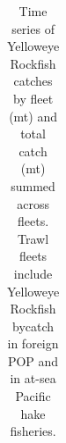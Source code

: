 \documentclass[
]{scrartcl}
\begin{document}
\endgroup

\newpage{}

\begin{landscape}
\begingroup
\fontsize{9.0pt}{10.8pt}\selectfont

\begin{longtable}{>{\raggedleft\arraybackslash}p{\dimexpr 56.25pt -2\tabcolsep-1.5\arrayrulewidth}>{\raggedleft\arraybackslash}p{\dimexpr 56.25pt -2\tabcolsep-1.5\arrayrulewidth}>{\raggedleft\arraybackslash}p{\dimexpr 56.25pt -2\tabcolsep-1.5\arrayrulewidth}>{\raggedleft\arraybackslash}p{\dimexpr 56.25pt -2\tabcolsep-1.5\arrayrulewidth}>{\raggedleft\arraybackslash}p{\dimexpr 56.25pt -2\tabcolsep-1.5\arrayrulewidth}>{\raggedleft\arraybackslash}p{\dimexpr 56.25pt -2\tabcolsep-1.5\arrayrulewidth}>{\raggedleft\arraybackslash}p{\dimexpr 56.25pt -2\tabcolsep-1.5\arrayrulewidth}>{\raggedleft\arraybackslash}p{\dimexpr 56.25pt -2\tabcolsep-1.5\arrayrulewidth}>{\raggedleft\arraybackslash}p{\dimexpr 56.25pt -2\tabcolsep-1.5\arrayrulewidth}}

\caption{\label{tbl-all_removals}Time series of Yelloweye Rockfish
catches by fleet (mt) and total catch (mt) summed across fleets. Trawl
fleets include Yelloweye Rockfish bycatch in foreign POP and in at-sea
Pacific hake fisheries.}

\tabularnewline


\end{longtable}
\end{landscape}
\end{document}
